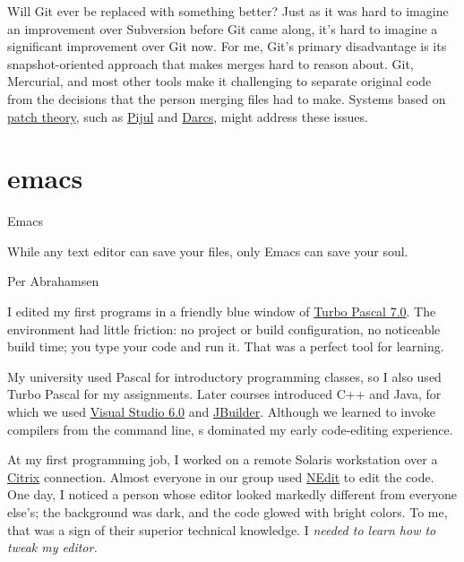 \documentclass{article}
\begin{document}
Will Git ever be replaced with something better?
Just as it was hard to imagine an improvement over Subversion before Git came along, it's hard to imagine a significant improvement over Git now.
For me, Git's primary disadvantage is its snapshot-oriented approach that makes merges hard to reason about.
Git, Mercurial, and most other tools make it challenging to separate original code from the decisions that the person merging files had to make.
Systems based on \href{https://en.m.wikibooks.org/wiki/Understanding_Darcs/Patch_theory}{patch theory}, such as \href{https://pijul.org/}{Pijul} and \href{https://darcs.net/}{Darcs}, might address these issues.

\section{emacs}{Emacs}

\epigraph{
  While any text editor can save your files, only Emacs can save your soul.
}{Per Abrahamsen}

I edited my first programs in a friendly blue window of \href{https://en.wikipedia.org/wiki/Turbo_Pascal}{Turbo Pascal 7.0}.
The environment had little friction: no project or build configuration, no noticeable build time; you type your code and run it.
That was a perfect tool for learning.

My university used Pascal for introductory programming classes, so I also used Turbo Pascal for my assignments.
Later courses introduced C++ and Java, for which we used \href{https://en.wikipedia.org/wiki/Visual_Studio#6.0_(1998)}{Visual Studio 6.0} and \href{https://en.wikipedia.org/wiki/JBuilder}{JBuilder}.
Although we learned to invoke compilers from the command line, s dominated my early code-editing experience.

At my first programming job, I worked on a remote Solaris workstation over a \href{https://en.wikipedia.org/wiki/Citrix_Systems}{Citrix} connection.
Almost everyone in our group used \href{https://en.wikipedia.org/wiki/NEdit}{NEdit} to edit the code.
One day, I noticed a person whose editor looked markedly different from everyone else's; the background was dark, and the code glowed with bright colors.
To me, that was a sign of their superior technical knowledge.
I \em{needed} to learn how to tweak my editor.
\end{document}
